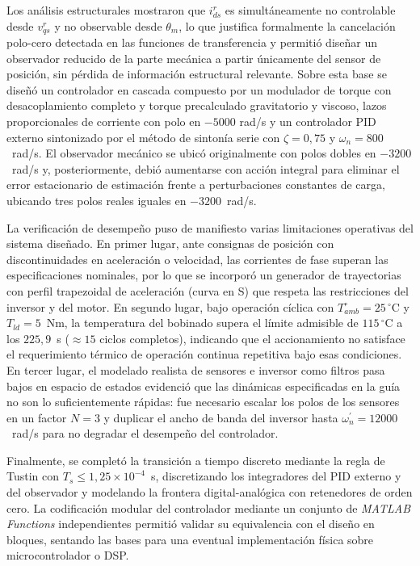 \documentclass[12pt, a4paper,journal, onecolumn, compsoc]{IEEEtran}
\begin{document}
Los análisis estructurales mostraron que $i_{ds}^{r}$ es simultáneamente no controlable desde $v_{qs}^{r}$ y no observable desde $\theta_m$, lo que justifica formalmente la cancelación polo-cero detectada en las funciones de transferencia y permitió diseñar un observador reducido de la parte mecánica a partir únicamente del sensor de posición, sin pérdida de información estructural relevante. Sobre esta base se diseñó un controlador en cascada compuesto por un modulador de torque con desacoplamiento completo y torque precalculado gravitatorio y viscoso, lazos proporcionales de corriente con polo en $-5000$ rad/s y un controlador PID externo sintonizado por el método de sintonía serie con $\zeta = 0{,}75$ y $\omega_n = 800$~rad/s. El observador mecánico se ubicó originalmente con polos dobles en $-3200$~rad/s y, posteriormente, debió aumentarse con acción integral para eliminar el error estacionario de estimación frente a perturbaciones constantes de carga, ubicando tres polos reales iguales en $-3200$~rad/s.

La verificación de desempeño puso de manifiesto varias limitaciones operativas del sistema diseñado. En primer lugar, ante consignas de posición con discontinuidades en aceleración o velocidad, las corrientes de fase superan las especificaciones nominales, por lo que se incorporó un generador de trayectorias con perfil trapezoidal de aceleración (curva en S) que respeta las restricciones del inversor y del motor. En segundo lugar, bajo operación cíclica con $T_{amb}^\circ=25\,^\circ$C y $T_{ld}=5$~Nm, la temperatura del bobinado supera el límite admisible de $115\,^\circ$C a los $225{,}9$~s ($\approx 15$ ciclos completos), indicando que el accionamiento no satisface el requerimiento térmico de operación continua repetitiva bajo esas condiciones. En tercer lugar, el modelado realista de sensores e inversor como filtros pasa bajos en espacio de estados evidenció que las dinámicas especificadas en la guía no son lo suficientemente rápidas: fue necesario escalar los polos de los sensores en un factor $N=3$ y duplicar el ancho de banda del inversor hasta $\omega_n^{\prime}=12000$~rad/s para no degradar el desempeño del controlador.

Finalmente, se completó la transición a tiempo discreto mediante la regla de Tustin con $T_s \leq 1{,}25\times 10^{-4}$~s, discretizando los integradores del PID externo y del observador y modelando la frontera digital-analógica con retenedores de orden cero. La codificación modular del controlador mediante un conjunto de \textit{MATLAB Functions} independientes permitió validar su equivalencia con el diseño en bloques, sentando las bases para una eventual implementación física sobre microcontrolador o DSP.
\end{document}

